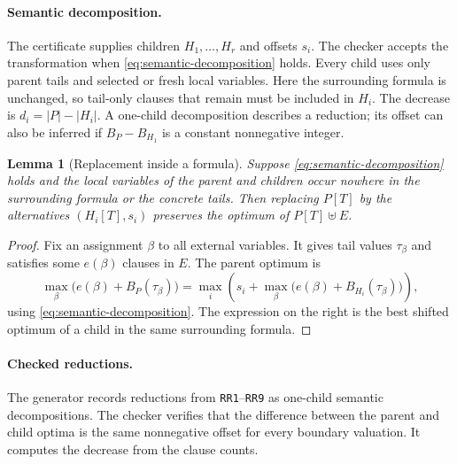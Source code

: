 \documentclass[11pt]{article}
\newtheorem{lemma}[theorem]{Lemma}
\theoremstyle{definition}
\theoremstyle{remark}
\begin{document}
\paragraph{Semantic decomposition.}
The certificate supplies children $H_1,\ldots,H_r$ and offsets $s_i$. The
checker accepts the transformation when
\cref{eq:semantic-decomposition} holds.
Every child uses only parent tails and selected or fresh local variables.
Here the surrounding formula is unchanged, so tail-only clauses that remain
must be included in $H_i$. The decrease is
$d_i=|P|-|H_i|$. A one-child decomposition describes a reduction; its offset
can also be inferred if $B_P-B_{H_1}$ is a constant nonnegative integer.

\begin{lemma}[Replacement inside a formula]
\label{lem:contextual-replacement}
Suppose \cref{eq:semantic-decomposition} holds and the local variables of the
parent and children occur nowhere in the surrounding formula or the concrete
tails. Then replacing $P[T]$ by the alternatives $(H_i[T],s_i)$ preserves the
optimum of $P[T]\uplus E$.
\end{lemma}
\begin{proof}
Fix an assignment $\beta$ to all external variables. It gives tail values
$\tau_\beta$ and satisfies some $e(\beta)$ clauses in $E$. The parent optimum
is
\[
 \max_\beta\bigl(e(\beta)+B_P(\tau_\beta)\bigr)
 =\max_i\left(s_i+
   \max_\beta\bigl(e(\beta)+B_{H_i}(\tau_\beta)\bigr)\right),
\]
using \cref{eq:semantic-decomposition}. The expression on the right is the
best shifted optimum of a child in the same surrounding formula.
\end{proof}

\paragraph{Checked reductions.}
The generator records reductions from \texttt{RR1}--\texttt{RR9} as
one-child semantic decompositions. The checker verifies that the difference
between the parent and child optima is the same nonnegative offset for every
boundary valuation. It computes the decrease from the clause counts.
\end{document}
